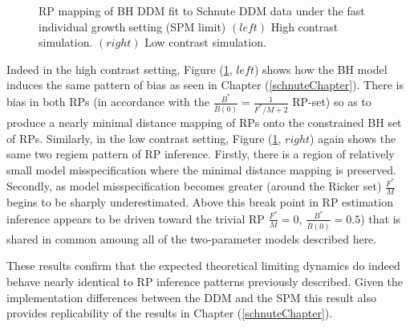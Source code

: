 \begin{figure}[h!]
\begin{minipage}[h!]{0.09\textwidth}
\end{minipage}
\caption{
RP mapping of BH DDM fit to Schnute DDM data under the fast individual growth setting (SPM limit)
$(left)$ High contrast simulation.
$(right)$ Low contrast simulation.
}\label{prodLimit}
\end{figure}


Indeed in the high contrast setting, Figure (\ref{prodLimit}, $left$) shows
how the BH model induces the same pattern of bias as seen in Chapter
(\ref{schnuteChapter}). There is bias in both RPs (in accordance with the
$\frac{B^*}{\bar B(0)}=\frac{1}{F^*/M+2}$ RP-set) so as to produce a nearly
minimal distance mapping of RPs onto the constrained BH set of RPs.
Similarly, in the low contrast setting, Figure (\ref{prodLimit}, $right$) again
shows the same two regiem pattern of RP inference. Firstly, there is a region of
relatively small model misspecification where the minimal distance mapping
is preserved. Secondly, as model misspecification becomes greater (around the
Ricker set) $\frac{F^*}{M}$ begins to be sharply underestimated. Above this
break point in RP estimation inference appears to be driven toward the trivial RP
$\frac{F^*}{M}=0$, $\frac{B^*}{\bar B(0)}=0.5$) that is shared in common
amoung all of the two-parameter models described here.

%
These results confirm that the expected theoretical limiting dynamics do indeed behave 
nearly identical to RP inference patterns previously described. Given the implementation 
differences between the DDM and the SPM this result also provides replicability %
of the results in Chapter (\ref{schnuteChapter}). 

